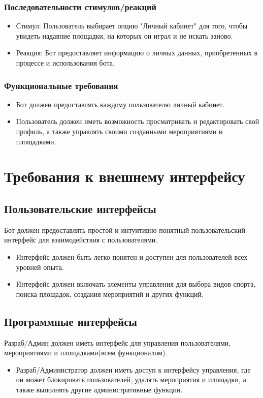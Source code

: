 \documentclass{scrreprt}
\begin{document}
\subsection{Последовательности стимулов/реакций}
\begin{itemize}
    \item Стимул: Пользователь выбирает опцию "Личный кабинет" для того, чтобы увидеть надавние площадки, на которых он играл и не искать заново.
    \item Реакция: Бот предоставляет информацию о личных данных, приобретенных в процессе и использования бота.
\end{itemize}

\subsection{Функциональные требования}
\begin{itemize}
    \item Бот должен предоставлять каждому пользователю личный кабинет.
    \item Пользователь должен иметь возможность просматривать и редактировать свой профиль, а также управлять своими созданными мероприятиями и площадками.
\end{itemize}


\chapter{Требования к внешнему интерфейсу}

\section{Пользовательские интерфейсы}
Бот должен предоставлять простой и интуитивно понятный пользовательский интерфейс для взаимодействия с пользователями.
\begin{itemize}
    \item Интерфейс должен быть легко понятен и доступен для пользователей всех уровней опыта.
    \item Интерфейс должен включать элементы управления для выбора видов спорта, поиска площадок, создания мероприятий и других функций.
\end{itemize}

\section{Программные интерфейсы}
Разраб/Админ должен иметь интерфейс для управления пользователями, мероприятиями и площадками(всем функционалом).
\begin{itemize}
    \item Разраб/Администратор должен иметь доступ к интерфейсу управления, где он может блокировать пользователей, удалять мероприятия и площадки, а также выполнять другие административные функции.
\end{itemize}
\end{document}
